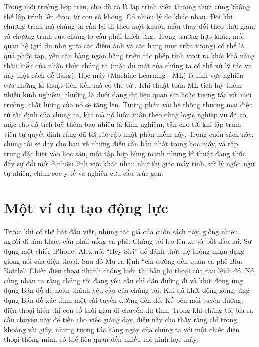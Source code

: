 \documentclass[letterpaper,11pt,english]{sphinxmanual}
\begin{document}
Trong mỗi trường hợp trên, cho dù có là lập trình viên thượng thừa cũng
không thể lập trình lên được từ con số không. Có nhiều lý do khác nhau.
Đôi khi chương trình mà chúng ta cần lại đi theo một khuôn mẫu thay đổi
theo thời gian, và chương trình của chúng ta cần phải thích ứng. Trong
trường hợp khác, mối quan hệ (giả dụ như giữa các điểm ảnh và các hạng
mục trừu tượng) có thể là quá phức tạp, yêu cầu hàng ngàn hàng triệu các
phép tính vượt ra khỏi khả năng thấu hiểu của nhận thức chúng ta (mặc dù
mắt của chúng ta có thể xử lý tác vụ này một cách dễ dàng). Học máy
(Machine Learning - ML) là lĩnh vực nghiên cứu những kĩ thuật tiên tiến
mà có thể  từ . Khi thuật toán ML tích luỹ thêm nhiều
kinh nghiệm, thường là dưới dạng dữ liệu quan sát hoặc tương tác với môi
trường, chất lượng của nó sẽ tăng lên. Tương phản với hệ thống thương
mại điện tử tất định của chúng ta, khi mà nó luôn tuân theo cùng logic
nghiệp vụ đã có, mặc cho đã tích luỹ thêm bao nhiêu là kinh nghiệm, tận
cho tới khi lập trình viên tự quyết định rằng đã tới lúc cập nhật phần
mềm này. Trong cuốn sách này, chúng tôi sẽ dạy cho bạn về những điều căn
bản nhất trong học máy, và tập trung đặc biệt vào học sâu, một tập hợp
hùng mạnh những kĩ thuật đang thúc đẩy sự đổi mới ở nhiều lĩnh vực khác
nhau như thị giác máy tính, xử lý ngôn ngữ tự nhiên, chăm sóc y tế và
nghiên cứu cấu trúc gen.








\section{Một ví dụ tạo động lực}
\label{\detokenize{chapter_introduction/index_vn:mot-vi-du-tao-dong-luc}}


Trước khi có thể bắt đầu viết, những tác giả của cuốn sách này, giống
nhiều người đi làm khác, cần phải uống cà phê. Chúng tôi leo lên xe và
bắt đầu lái. Sử dụng một chiếc iPhone, Alex nói “Hey Siri” để đánh thức
hệ thống nhận dạng giọng nói của điện thoại. Sau đó Mu ra lệnh “chỉ
đường đến quán cà phê Blue Bottle”. Chiếc điện thoại nhanh chóng hiển
thị bản ghi thoại của câu lệnh đó. Nó cũng nhận ra rằng chúng tôi đang
yêu cầu chỉ dẫn đường đi và khởi động ứng dụng Bản đồ để hoàn thành yêu
cầu của chúng tôi. Khi đã khởi động xong, ứng dụng Bản đồ xác định một
vài tuyến đường đến đó. Kế bên mỗi tuyến đường, điện thoại hiển thị con
số thời gian di chuyển dự tính. Trong khi chúng tôi bịa ra câu chuyện
này để tiện cho việc giảng dạy, điều này cho thấy rằng chỉ trong khoảng
vài giây, những tương tác hàng ngày của chúng ta với một chiếc điện
thoại thông minh có thể liên quan đến nhiều mô hình học máy.
\end{document}
